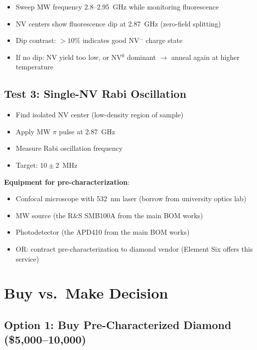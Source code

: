 \documentclass[11pt,a4paper,openany]{book}
\begin{document}
\begin{itemize}[nosep]
  \item Sweep MW frequency 2.8--2.95~GHz while monitoring fluorescence
  \item NV centers show fluorescence dip at 2.87~GHz (zero-field splitting)
  \item Dip contrast: $> 10\%$ indicates good NV$^-$ charge state
  \item If no dip: NV yield too low, or NV$^0$ dominant $\to$ anneal again at higher temperature
\end{itemize}

\subsection{Test 3: Single-NV Rabi Oscillation}

\begin{itemize}[nosep]
  \item Find isolated NV center (low-density region of sample)
  \item Apply MW $\pi$ pulse at 2.87~GHz
  \item Measure Rabi oscillation frequency
  \item Target: $10 \pm 2$~MHz
\end{itemize}

\noindent
\textbf{Equipment for pre-characterization}:
\begin{itemize}[nosep]
  \item Confocal microscope with 532~nm laser (borrow from university optics lab)
  \item MW source (the R\&S SMB100A from the main BOM works)
  \item Photodetector (the APD410 from the main BOM works)
  \item OR: contract pre-characterization to diamond vendor (Element Six offers this service)
\end{itemize}

\section{Buy vs.\ Make Decision}

\subsection{Option 1: Buy Pre-Characterized Diamond (\$5,000--10,000)}
\end{document}
